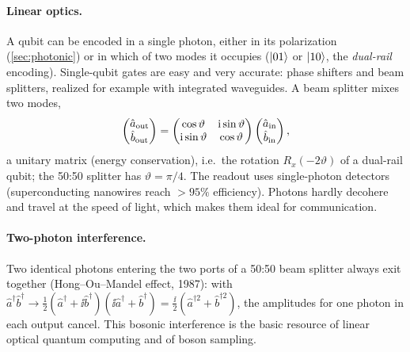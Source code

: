 \paragraph{Linear optics.} A qubit can be encoded in a single photon, either in its polarization (\cref{sec:photonic}) or in which of two modes it occupies ($\left|01\right\rangle$ or $\left|10\right\rangle$, the \emph{dual-rail} encoding). Single-qubit gates are easy and very accurate:
phase shifters and beam splitters, realized for example with integrated waveguides. A beam splitter mixes two modes,
\begin{equation}
  \begin{pmatrix}\hat a_{\rm out}\\ \hat b_{\rm out}\end{pmatrix}=\begin{pmatrix}\cos\vartheta&\mathrm i\sin\vartheta\\ \mathrm i\sin\vartheta&\cos\vartheta\end{pmatrix}\begin{pmatrix}\hat a_{\rm in}\\ \hat b_{\rm in}\end{pmatrix},
\end{equation}
a unitary matrix (energy conservation), i.e.\ the rotation $R_x(-2\vartheta)$ of a dual-rail qubit; the 50:50 splitter has $\vartheta=\pi/4$. The readout uses single-photon detectors (superconducting nanowires reach $>95\%$ efficiency). Photons hardly
decohere and travel at the speed of light, which makes them ideal for communication.

\paragraph{Two-photon interference.} Two identical photons entering the two ports of a 50:50 beam splitter always exit together (Hong--Ou--Mandel effect, 1987): with $\hat a^\dagger\hat b^\dagger\to\frac12(\hat a^\dagger+\ii\hat b^\dagger)(\ii\hat a^\dagger+\hat b^\dagger)
=\frac\ii2(\hat a^{\dagger2}+\hat b^{\dagger2})$, the amplitudes for one photon in each output cancel. This bosonic interference is the basic resource of linear optical quantum computing and of boson sampling.

